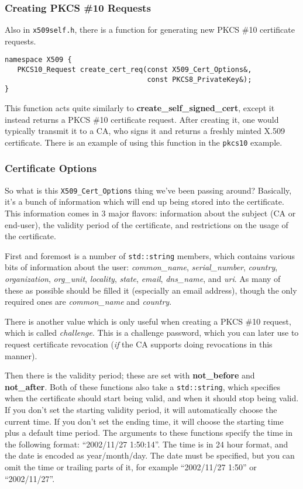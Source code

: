 \documentclass{article}
\newcommand{\filename}[1]{\texttt{#1}}
\newcommand{\function}[1]{\textbf{#1}}
\newcommand{\type}[1]{\texttt{#1}}
\renewcommand{\arg}[1]{\textsl{#1}}
\begin{document}
\subsubsection{Creating PKCS \#10 Requests}

Also in \filename{x509self.h}, there is a function for generating new PKCS \#10
certificate requests.

\begin{verbatim}
namespace X509 {
   PKCS10_Request create_cert_req(const X509_Cert_Options&,
                                  const PKCS8_PrivateKey&);
}
\end{verbatim}

This function acts quite similarly to \function{create\_self\_signed\_cert},
except it instead returns a PKCS \#10 certificate request. After creating it,
one would typically transmit it to a CA, who signs it and returns a freshly
minted X.509 certificate. There is an example of using this function in the
\filename{pkcs10} example.

\subsubsection{Certificate Options}

So what is this \type{X509\_Cert\_Options} thing we've been passing around?
Basically, it's a bunch of information which will end up being stored into the
certificate. This information comes in 3 major flavors: information about the
subject (CA or end-user), the validity period of the certificate, and
restrictions on the usage of the certificate.

First and foremost is a number of \type{std::string} members, which contains
various bits of information about the user: \arg{common\_name},
\arg{serial\_number}, \arg{country}, \arg{organization}, \arg{org\_unit},
\arg{locality}, \arg{state}, \arg{email}, \arg{dns\_name}, and \arg{uri}. As
many of these as possible should be filled it (especially an email address),
though the only required ones are \arg{common\_name} and \arg{country}.

There is another value which is only useful when creating a PKCS \#10 request,
which is called \arg{challenge}. This is a challenge password, which you can
later use to request certificate revocation (\emph{if} the CA supports doing
revocations in this manner).

Then there is the validity period; these are set with \function{not\_before}
and \function{not\_after}. Both of these functions also take a
\type{std::string}, which specifies when the certificate should start being
valid, and when it should stop being valid. If you don't set the starting
validity period, it will automatically choose the current time. If you don't
set the ending time, it will choose the starting time plus a default time
period. The arguments to these functions specify the time in the following
format: ``2002/11/27 1:50:14''. The time is in 24 hour format, and the date is
encoded as year/month/day. The date must be specified, but you can omit the
time or trailing parts of it, for example ``2002/11/27 1:50'' or
``2002/11/27''.
\end{document}
